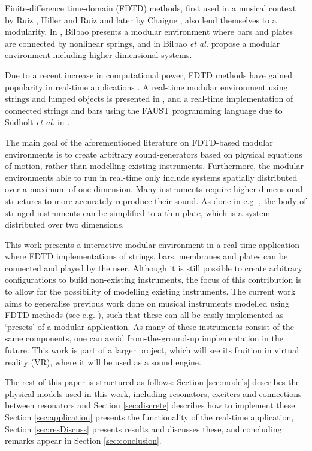 \documentclass{article}
\begin{document}
Finite-difference time-domain (FDTD) methods, first used in a musical context by Ruiz \cite{Ruiz1969}, Hiller and Ruiz \cite{Hiller1971I, Hiller1971II} and later by Chaigne \cite{Chaigne1992}, also lend themselves to a modularity. In \cite{Bilbao2009Modular}, Bilbao presents a modular environment where bars and plates are connected by nonlinear springs, and in \cite{Bilbao2014} Bilbao \textit{et al.} propose a modular environment including higher dimensional systems.

Due to a recent increase in computational power, FDTD methods have gained popularity in real-time applications \cite{WillemsenThesis}. A real-time modular environment using strings and lumped objects is presented in \cite{Bilbao2019}, and a real-time implementation of connected strings and bars using the FAUST programming language due to S\"udholt \textit{et al.} in \cite{Sudholt2021}. 

The main goal of the aforementioned literature on FDTD-based modular environments is to create arbitrary sound-generators based on physical equations of motion, rather than modelling existing instruments. Furthermore, the modular environments able to run in real-time only include systems spatially distributed over a maximum of one dimension. Many instruments require higher-dimensional structures to more accurately reproduce their sound. As done in e.g. \cite{Willemsen2019, Willemsen2020}, the body of stringed instruments can be simplified to a thin plate, which is a system distributed over two dimensions. 

This work presents a interactive modular environment in a real-time application where FDTD implementations of strings, bars, membranes and plates can be connected and played by the user. Although it is still possible to create arbitrary configurations to build non-existing instruments, the focus of this contribution is to allow for the possibility of modelling existing instruments. The current work aims to generalise previous work done on musical instruments modelled using FDTD methods (see e.g. \cite{Willemsen2019, Willemsen2020, Lasickas2021, Sudholt2021Langeleik, Mosen2021}), such that these can all be easily implemented as `presets' of a modular application. As many of these instruments consist of the same components, one can avoid from-the-ground-up implementation in the future. This work is part of a larger project, which will see its fruition in virtual reality (VR), where it will be used as a sound engine.

The rest of this paper is structured as follows: Section \ref{sec:models} describes the physical models used in this work, including resonators, exciters and connections between resonators and Section \ref{sec:discrete} describes how to implement these. Section \ref{sec:application} presents the functionality of the real-time application, Section \ref{sec:resDiscuss} presents results and discusses these, and concluding remarks appear in Section \ref{sec:conclusion}.
\end{document}
